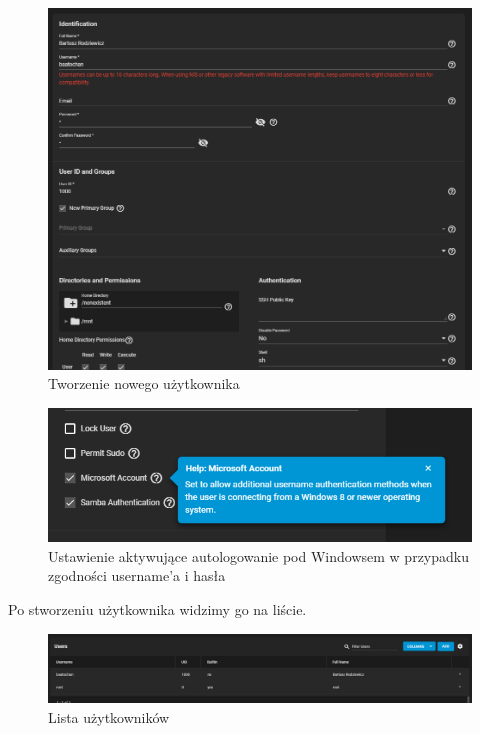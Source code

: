 \documentclass[12pt,a4paper]{article}
\newcommand{\<}{\langle}
\renewcommand{\>}{\rangle}
\theoremstyle{definition}
\begin{document}
\begin{figure}[H]
    \centering
    \includegraphics[width=\linewidth]{img/ss_truenas/28.png}
    \caption{Tworzenie nowego użytkownika}
\end{figure}
\begin{figure}[H]
    \centering
    \includegraphics[width=\linewidth]{img/ss_truenas/29.png}
    \caption{Ustawienie aktywujące autologowanie pod Windowsem w przypadku zgodności username'a i hasła}
\end{figure}

Po stworzeniu użytkownika widzimy go na liście.

\begin{figure}[H]
    \centering
    \includegraphics[width=\linewidth]{img/ss_truenas/31.png}
    \caption{Lista użytkowników}
    \label{users_list2}
\end{figure}
\end{document}

